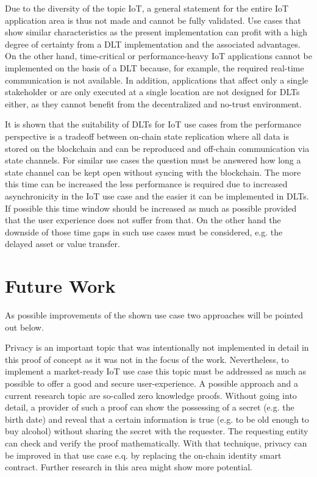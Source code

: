 \documentclass[conference]{IEEEtran}
\begin{document}
Due to the diversity of the topic IoT, a general statement for the entire IoT application area is thus not made and cannot be fully validated. Use cases that show similar characteristics as the present implementation can profit with a high degree of certainty from a DLT implementation and the associated advantages. On the other hand, time-critical or performance-heavy IoT applications cannot be implemented on the basis of a DLT because, for example, the required real-time communication is not available. In addition, applications that affect only a single stakeholder or are only executed at a single location are not designed for DLTs either, as they cannot benefit from the decentralized and no-trust environment.

It is shown that the suitability of DLTs for IoT use cases from the performance perspective is a tradeoff between on-chain state replication where all data is stored on the blockchain and can be reproduced and off-chain communication via state channels. For similar use cases the question must be answered how long a state channel can be kept open without syncing with the blockchain. The more this time can be increased the less performance is required due to increased asynchronicity in the IoT use case and the easier it can be implemented in DLTs. If possible this time window should be increased as much as possible provided that the user experience does not suffer from that. On the other hand the downside of those time gaps in such use cases must be considered, e.g. the delayed asset or value transfer. 

%
\section{Future Work}

As possible improvements of the shown use case two approaches will be pointed out below.

Privacy is an important topic that was intentionally not implemented in detail in this proof of concept as it was not in the focus of the work. Nevertheless, to implement a market-ready IoT use case this topic must be addressed as much as possible to offer a good and secure user-experience. A possible approach and a current research topic are so-called zero knowledge proofs. Without going into detail, a provider of such a proof can show the possessing of a secret (e.g. the birth date) and reveal that a certain information is true (e.g. to be old enough to buy alcohol) without sharing the secret with the requester. The requesting entity can check and verify the proof mathematically. With that technique, privacy can be improved in that use case e.q. by replacing the on-chain identity smart contract. Further research in this area might show more potential.
\end{document}
